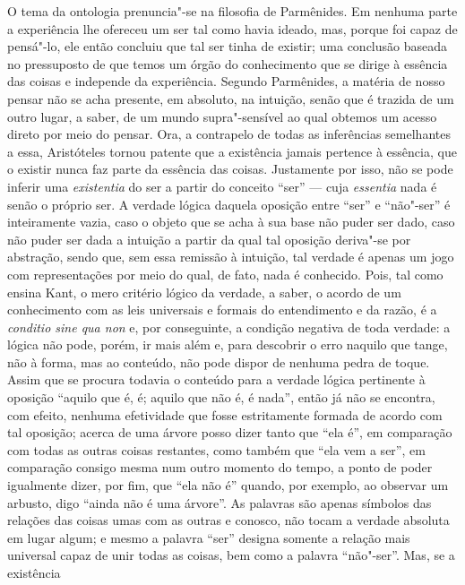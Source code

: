 O tema da ontologia prenuncia"-se na filosofia de Parmênides. Em
nenhuma \label{temadaontologia} parte a experiência lhe ofereceu um ser tal
como havia ideado, mas, porque foi capaz de pensá"-lo, ele então concluiu que
tal ser tinha de existir; uma conclusão baseada no pressuposto de que temos
um órgão do conhecimento que se dirige à essência das coisas e independe da
experiência. Segundo Parmênides, a matéria de nosso pensar não se acha
presente, em absoluto, na intuição, senão que é trazida de um outro lugar, a
saber, de um mundo supra"-sensível ao qual obtemos um acesso direto por meio
do pensar. Ora, a contrapelo de todas as inferências semelhantes a essa,
Aristóteles tornou patente que a existência jamais pertence à essência, que o
existir nunca faz parte da essência das coisas. Justamente por isso, não se
pode inferir uma \textit{existentia} do ser a partir do conceito ``ser'' --- cuja
\textit{essentia} nada é senão o próprio ser. A verdade lógica daquela
 oposição entre ``ser'' e ``não"-ser'' é inteiramente vazia, caso o objeto
 que se acha à sua base não puder ser dado, caso não puder ser dada a
 intuição a partir da qual tal oposição deriva"-se por abstração, sendo que,
 sem essa remissão à intuição, tal verdade é apenas um jogo com
 representações por meio do qual, de fato, nada é conhecido. Pois, tal como
 ensina Kant, o mero critério lógico da verdade, a saber, o acordo de um
 conhecimento com as leis universais e formais do entendimento e da razão, é
 a \textit{conditio sine qua non} e, por conseguinte, a condição negativa de
 toda verdade: a lógica não pode, porém, ir mais além e, para descobrir o
 erro naquilo que tange, não à forma, mas ao conteúdo, não pode dispor de
 nenhuma pedra de toque. Assim que se procura todavia o conteúdo para a
 verdade lógica pertinente à oposição ``aquilo que é, é; aquilo que não é, é
 nada'', então já não se encontra, com efeito, nenhuma efetividade que fosse
 estritamente formada de acordo com tal oposição; acerca de uma árvore posso
 dizer tanto que ``ela é'', em comparação com todas as outras coisas
 restantes, como também que ``ela vem a ser'', em comparação consigo mesma
 num outro momento do tempo, a ponto de poder igualmente dizer, por fim, que
 ``ela não é'' quando, por exemplo, ao observar um arbusto, digo ``ainda não
 é uma árvore''. As palavras são apenas símbolos das relações das coisas umas
 com as outras e conosco, não tocam a verdade absoluta em lugar algum; e
 mesmo a palavra ``ser'' designa somente a relação mais universal capaz de
 unir todas as coisas, bem como a palavra ``não"-ser''. Mas, se a existência
